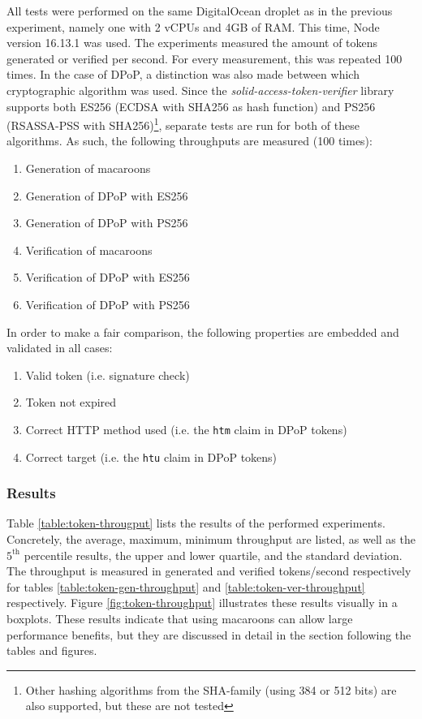All tests were performed on the same DigitalOcean droplet as in the previous experiment, namely one with 2 vCPUs and 4GB of RAM. This time, Node version 16.13.1 was used. The experiments measured the amount of tokens generated or verified per second. For every measurement, this was repeated 100 times. In the case of \gls{DPoP}, a distinction was also made between which cryptographic algorithm was used. Since the  \textit{solid-access-token-verifier} library supports both ES256 (ECDSA with SHA256 as hash function) and PS256 (RSASSA-PSS with SHA256)\footnote{Other hashing algorithms from the SHA-family (using 384 or 512 bits) are also supported, but these are not tested}, separate tests are run for both of these algorithms. As such, the following throughputs are measured (100 times):
\begin{enumerate}
    \item Generation of macaroons
    \item Generation of \gls{DPoP} with ES256
    \item Generation of \gls{DPoP} with PS256
    \item Verification of macaroons
    \item Verification of \gls{DPoP} with ES256
    \item Verification of \gls{DPoP} with PS256
\end{enumerate}

\noindent In order to make a fair comparison, the following properties are embedded and validated in all cases:
\begin{enumerate}
    \item Valid token (i.e. signature check)
    \item Token not expired
    \item Correct HTTP method used (i.e. the \texttt{htm} claim in \gls{DPoP} tokens)
    \item Correct target (i.e. the \texttt{htu} claim in \gls{DPoP} tokens)
\end{enumerate}

\subsubsection{Results}
Table \ref{table:token-througput} lists the results of the performed experiments. Concretely, the average, maximum, minimum throughput are listed, as well as the $5^{\text{th}}$ percentile results, the upper and lower quartile, and the standard deviation. The throughput is measured in generated and verified tokens/second respectively for tables \ref{table:token-gen-throughput} and \ref{table:token-ver-throughput} respectively. Figure \ref{fig:token-throughput} illustrates these results visually in a boxplots. These results indicate that using macaroons can allow large performance benefits, but they are discussed in detail in the section following the tables and figures.



